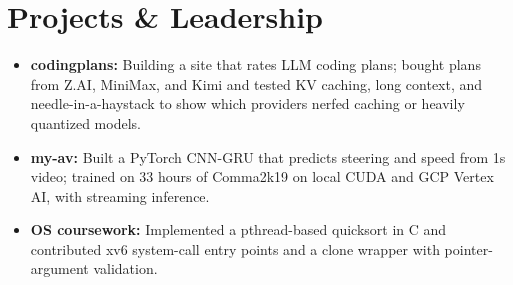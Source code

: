 \documentclass[11pt, letterpaper]{article}
\begin{document}
\section{Projects \& Leadership}
\begin{itemize}
  \item \textbf{codingplans:} Building a site that rates LLM coding plans; bought plans from Z.AI, MiniMax, and Kimi and tested KV caching, long context, and needle-in-a-haystack to show which providers nerfed caching or heavily quantized models.
  \item \textbf{my-av:} Built a PyTorch CNN-GRU that predicts steering and speed from 1s video; trained on 33 hours of Comma2k19 on local CUDA and GCP Vertex AI, with streaming inference.
  \item \textbf{OS coursework:} Implemented a pthread-based quicksort in C and contributed xv6 system-call entry points and a clone wrapper with pointer-argument validation.
\end{itemize}
\end{document}
